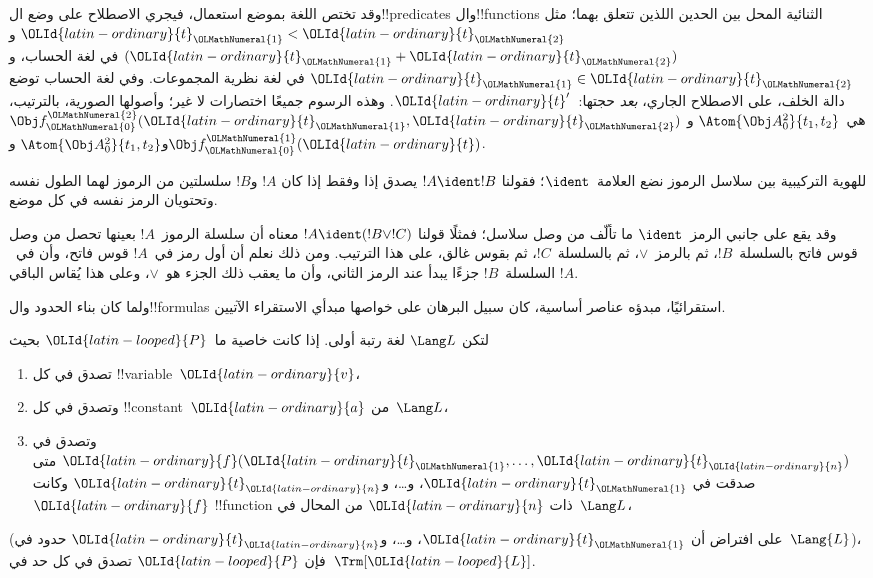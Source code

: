 \documentclass[../../../include/open-logic-section]{subfiles}
\begin{document}
وقد تختص اللغة بموضع استعمال، فيجري الاصطلاح على وضع ال!!{predicate}s
وال!!{function}s الثنائية المحل بين الحدين اللذين تتعلق بهما؛ مثل
$\OLId{latin-ordinary}{t}_\OLMathNumeral{1} < \OLId{latin-ordinary}{t}_\OLMathNumeral{2}$ و$(\OLId{latin-ordinary}{t}_\OLMathNumeral{1} + \OLId{latin-ordinary}{t}_\OLMathNumeral{2})$ في لغة الحساب، و$\OLId{latin-ordinary}{t}_\OLMathNumeral{1} \in \OLId{latin-ordinary}{t}_\OLMathNumeral{2}$ في لغة
نظرية المجموعات. وفي لغة الحساب توضع دالة الخلف، على الاصطلاح الجاري،
\emph{بعد} حجتها:~$\OLId{latin-ordinary}{t}'$. وهذه الرسوم جميعًا اختصارات لا غير؛ وأصولها
الصورية، بالترتيب، هي~$\Atom{\Obj A^2_0}{t_1, t_2}$ و
$\Obj f^\OLMathNumeral{2}_\OLMathNumeral{0}(\OLId{latin-ordinary}{t}_\OLMathNumeral{1}, \OLId{latin-ordinary}{t}_\OLMathNumeral{2})$ و$\Atom{\Obj A^2_0}{t_1, t_2}$ و$\Obj f^\OLMathNumeral{1}_\OLMathNumeral{0}(\OLId{latin-ordinary}{t})$.

\begin{defn}
للهوية التركيبية بين سلاسل الرموز نضع العلامة~$\ident$؛ فقولنا
$!A \ident !B$ يصدق إذا وفقط إذا كان $!A$ و$!B$ سلسلتين من الرموز لهما
الطول نفسه وتحتويان الرمز نفسه في كل موضع.
\end{defn}

وقد يقع على جانبي الرمز~$\ident$ ما تألّف من وصل سلاسل؛ فمثلًا قولنا
$!A \ident (!B \lor !C)$ معناه أن سلسلة الرموز~$!A$ بعينها تحصل من
وصل قوس فاتح بالسلسلة~$!B$، ثم بالرمز~$\lor$، ثم بالسلسلة~$!C$، ثم
بقوس غالق، على هذا الترتيب. ومن ذلك نعلم أن أول رمز في~$!A$
قوس فاتح، وأن في~$!A$ السلسلة~$!B$ جزءًا يبدأ عند الرمز الثاني،
وأن ما يعقب ذلك الجزء هو~$\lor$، وعلى هذا يُقاس الباقي.

ولما كان بناء الحدود وال!!{formula}s استقرائيًا، مبدؤه عناصر أساسية،
كان سبيل البرهان على خواصها مبدأي الاستقراء الآتيين.

\begin{lem}
    لتكن $\Lang L$ لغة رتبة أولى.
    إذا كانت خاصية ما~$\OLId{latin-looped}{P}$ بحيث
    \begin{enumerate}
        \item تصدق في كل !!{variable}~$\OLId{latin-ordinary}{v}$،
        \item وتصدق في كل !!{constant}~$\OLId{latin-ordinary}{a}$ من~$\Lang L$،
        \item وتصدق في $\OLId{latin-ordinary}{f}(\OLId{latin-ordinary}{t}_\OLMathNumeral{1},\dotsc,\OLId{latin-ordinary}{t}_\OLId{latin-ordinary}{n})$ متى صدقت في
        $\OLId{latin-ordinary}{t}_\OLMathNumeral{1}$، و\dots، و$\OLId{latin-ordinary}{t}_\OLId{latin-ordinary}{n}$ وكانت $\OLId{latin-ordinary}{f}$ !!{function} ذات $\OLId{latin-ordinary}{n}$ من
            المحال في~$\Lang L$،
    \end{enumerate}
    (على افتراض أن $\OLId{latin-ordinary}{t}_\OLMathNumeral{1}$، و\dots، و$\OLId{latin-ordinary}{t}_\OLId{latin-ordinary}{n}$ حدود في~$\Lang{L}$)،
    فإن $\OLId{latin-looped}{P}$ تصدق في كل حد في~$\Trm[\OLId{latin-looped}{L}]$.
\end{lem}
\end{document}
